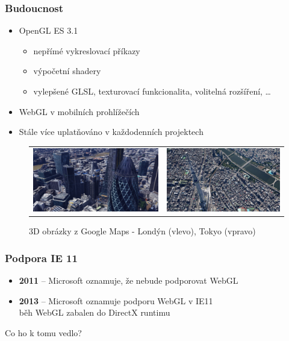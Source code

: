 \documentclass{beamer}
\begin{document}
		\begin{frame}[t,fragile]
		\frametitle{Budoucnost}					
		\begin{itemize}
			\item OpenGL ES 3.1
			\begin{itemize}
				\item nepřímé vykreslovací příkazy
				\item výpočetní shadery
				\item vylepšené GLSL, texturovací funkcionalita, volitelná rozšíření, \dots
			\end{itemize}
			\item WebGL v mobilních prohlížečích
			\item Stále více uplatňováno v každodenních projektech
		\end{itemize}	
		
		\vspace{-3mm}				
		
		\begin{figure}
		\centering\begin{tabular}{ll}
			\includegraphics[height=28mm]{img/london.jpg} &		
			\includegraphics[height=28mm]{img/tokyo.jpg}
		\end{tabular}		
		\caption{3D obrázky z Google Maps - Londýn (vlevo), Tokyo (vpravo)}
		\end{figure}
									
	\end{frame}	
	
	
	\begin{frame}[t,fragile]
		\frametitle{Podpora IE 11}					
		\begin{itemize}
	    	\item \textbf{2011} – Microsoft oznamuje, že nebude podporovat WebGL
			\item \textbf{2013} – Microsoft oznamuje podporu WebGL v IE11 \\
			\footnotesize{běh WebGL zabalen do DirectX runtimu}		
		\end{itemize}	
		
		\vspace{15mm}
		\centering
		\Huge{Co ho k tomu vedlo?}
		
		
		
	\end{frame}
	
\end{document}
